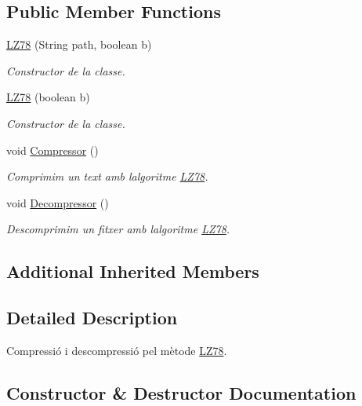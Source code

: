 \subsection*{Public Member Functions}
\begin{DoxyCompactItemize}
\item 
\hyperlink{classdomini_1_1algorithm_1_1LZ78_a89c121da8ae75e24f1cf0d06530d0b89}{L\+Z78} (String path, boolean b)
\begin{DoxyCompactList}\small\item\em Constructor de la classe. \end{DoxyCompactList}\item 
\hyperlink{classdomini_1_1algorithm_1_1LZ78_abdeba774404b53d266e9fbe4aa35f757}{L\+Z78} (boolean b)
\begin{DoxyCompactList}\small\item\em Constructor de la classe. \end{DoxyCompactList}\item 
void \hyperlink{classdomini_1_1algorithm_1_1LZ78_a6ce2ce6b2ce14cbe5177f379becbb2d1}{Compressor} ()
\begin{DoxyCompactList}\small\item\em Comprimim un text amb l\textquotesingle{}algoritme \hyperlink{classdomini_1_1algorithm_1_1LZ78}{L\+Z78}. \end{DoxyCompactList}\item 
void \hyperlink{classdomini_1_1algorithm_1_1LZ78_a0872cb8224ffd478b992490df06f6ecf}{Decompressor} ()
\begin{DoxyCompactList}\small\item\em Descomprimim un fitxer amb l\textquotesingle{}algoritme \hyperlink{classdomini_1_1algorithm_1_1LZ78}{L\+Z78}. \end{DoxyCompactList}\end{DoxyCompactItemize}
\subsection*{Additional Inherited Members}


\subsection{Detailed Description}
Compressió i descompressió pel mètode \hyperlink{classdomini_1_1algorithm_1_1LZ78}{L\+Z78}. 

\subsection{Constructor \& Destructor Documentation}
\mbox{\label{classdomini_1_1algorithm_1_1LZ78_a89c121da8ae75e24f1cf0d06530d0b89}} 
